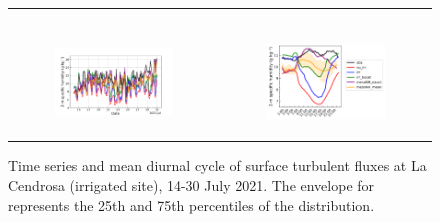\begin{figure}[hbtp]
\begin{tabular}{cc}
\begin{subfigure}[t]{0.5\textwidth}
        \end{subfigure} \\
        \begin{subfigure}[t]{0.5\textwidth}
            \caption{}
            \includegraphics[width=\textwidth]{images/chap5/SOP_TS_DC/time_series_cendrosa_q2m.png}
        \end{subfigure} &
        \begin{subfigure}[t]{0.5\textwidth}
            \caption{}
            \includegraphics[width=\textwidth]{images/chap5/SOP_TS_DC/diurnal_cycle_cendrosa_q2m.png}
        \end{subfigure}
    \end{tabular}
    \caption{Time series and mean diurnal cycle of surface turbulent fluxes at La Cendrosa (irrigated site), 14-30 July 2021. The envelope for \mesomean represents the 25th and 75th percentiles of the distribution.}
    \label{fig:cendrosa_surfacevars}
\end{figure}


